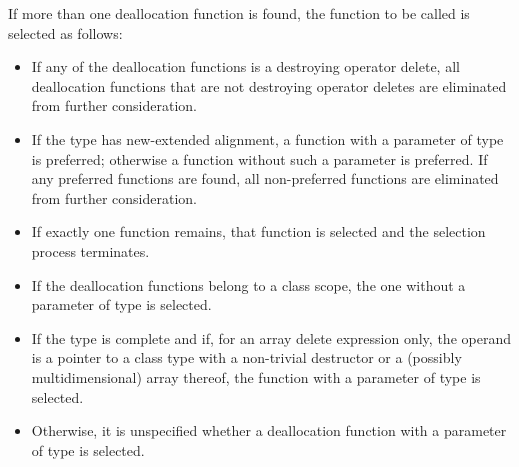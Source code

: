 \pnum
If more than one deallocation function is found,
the function to be called is selected as follows:
\begin{itemize}
\item
If any of the deallocation functions is a destroying operator delete,
all deallocation functions that are not destroying operator deletes
are eliminated from further consideration.
\item
If the type has new-extended alignment,
a function with a parameter of type  is preferred;
otherwise a function without such a parameter is preferred.
If any preferred functions are found,
all non-preferred functions are eliminated from further consideration.
\item
If exactly one function remains,
that function is selected and the selection process terminates.
\item
If the deallocation functions belong to a class scope,
the one without a parameter of type  is selected.
\item
If the type is complete
and if, for an array delete expression only,
the operand is a pointer to a class type with a
non-trivial destructor or a (possibly multidimensional) array thereof,
the function with a parameter of type  is selected.
\item
Otherwise, it is unspecified
whether a deallocation function with a parameter of type 
is selected.
\end{itemize}

